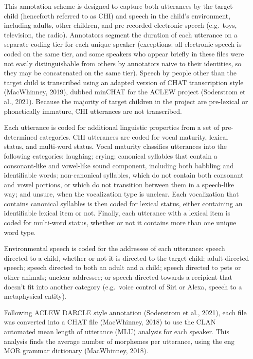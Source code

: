 \documentclass[english,man]{apa6}
\begin{document}
This annotation scheme is designed to capture both utterances by the target child (henceforth referred to as CHI) and speech in the child's environment, including adults, other children, and pre-recorded electronic speech (e.g.~toys, television, the radio). Annotators segment the duration of each utterance on a separate coding tier for each unique speaker (exceptions: all electronic speech is coded on the same tier, and some speakers who appear briefly in these files were not easily distinguishable from others by annotators naive to their identities, so they may be concatenated on the same tier). Speech by people other than the target child is transcribed using an adapted version of CHAT transcription style (MacWhinney, 2019), dubbed minCHAT for the ACLEW project (Soderstrom et al., 2021). Because the majority of target children in the project are pre-lexical or phonetically immature, CHI utterances are not transcribed.

Each utterance is coded for additional linguistic properties from a set of pre-determined categories. CHI utterances are coded for vocal maturity, lexical status, and multi-word status. Vocal maturity classifies utterances into the following categories: laughing; crying; canonical syllables that contain a consonant-like and vowel-like sound component, including both babbling and identifiable words; non-canonical syllables, which do not contain both consonant and vowel portions, or which do not transition between them in a speech-like way; and unsure, when the vocalization type is unclear. Each vocalization that contains canonical syllables is then coded for lexical status, either containing an identifiable lexical item or not. Finally, each utterance with a lexical item is coded for multi-word status, whether or not it contains more than one unique word type.

Environmental speech is coded for the addressee of each utterance: speech directed to a child, whether or not it is directed to the target child; adult-directed speech; speech directed to both an adult and a child; speech directed to pets or other animals; unclear addressee; or speech directed towards a recipient that doesn't fit into another category (e.g.~voice control of Siri or Alexa, speech to a metaphysical entity).

Following ACLEW DARCLE style annotation (Soderstrom et al., 2021), each file was converted into a CHAT file (MacWhinney, 2018) to use the CLAN automated mean length of utterance (MLU) analysis for each speaker. This analysis finds the average number of morphemes per utterance, using the eng MOR grammar dictionary (MacWhinney, 2018).
\end{document}
